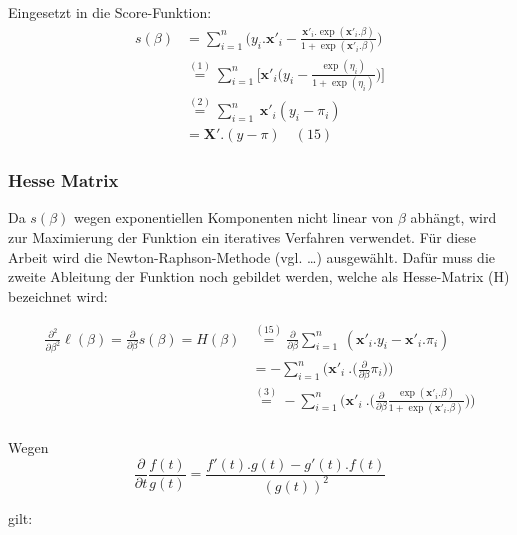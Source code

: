 \documentclass[12pt,]{article}
\begin{document}
Eingesetzt in die Score-Funktion: \[
\begin{aligned}
s(\beta) &= \sum_{i = 1}^{n} \Bigg( y_i.\mathbf{x'}_i - \frac{\mathbf{x'}_i.\exp(\mathbf{x'}_i.\beta)}{1 + \exp(\mathbf{x'}_i.\beta)} \Bigg) \\
&\mathrel{\overset{(1)}{=}}\sum_{i = 1}^{n} \Bigg[ \mathbf{x'}_i \Bigg( y_i - \frac{\exp(\eta_i)}{1 + \exp(\eta_i)} \Bigg) \Bigg] \\
&\mathrel{\overset{(2)}{=}}  \sum_{i = 1}^{n} \ \mathbf{x'}_i ( y_i - \pi_i) \quad  \\
&= \mathbf{X}'.(y-\pi) \quad (15) 
\end{aligned}
\]

\subsubsection{Hesse Matrix}\label{hesse-matrix}

Da \(s(\beta)\) wegen exponentiellen Komponenten nicht linear von
\(\beta\) abhängt, wird zur Maximierung der Funktion ein iteratives
Verfahren verwendet. Für diese Arbeit wird die Newton-Raphson-Methode
(vgl. \ldots{}) ausgewählt. Dafür muss die zweite Ableitung der Funktion
noch gebildet werden, welche als Hesse-Matrix (H) bezeichnet wird:

\[
\begin{aligned}
\frac{\partial^2}{\partial \beta^2} \ell(\beta) = \frac{\partial}{\partial \beta} s(\beta) = H(\beta) &\mathrel{\overset{(15)}{=}} \frac{\partial}{\partial \beta} \sum_{i = 1}^{n} \ (\mathbf{x'}_i.y_i - \mathbf{x'}_i.\pi_i) \\
&= - \sum_{i = 1}^{n} \Bigg( \mathbf{x'}_i \ .  \Big(\frac{\partial}{\partial \beta} \pi_i \Big) \Bigg) \\
&\mathrel{\overset{(3)}{=}} - \sum_{i = 1}^{n} \Bigg( \mathbf{x'}_i \ .  \Big(\frac{\partial}{\partial \beta} \frac{\exp(\mathbf{x'}_i.\beta)}{1+\exp(\mathbf{x'}_i.\beta)} \Big) \Bigg) \\
\end{aligned}
\]

Wegen \[
\frac{\partial}{\partial t} \frac{f(t)}{g(t)} = \frac{f'(t).g(t) - g'(t).f(t)}{(g(t))^2}
\]

gilt:
\end{document}
